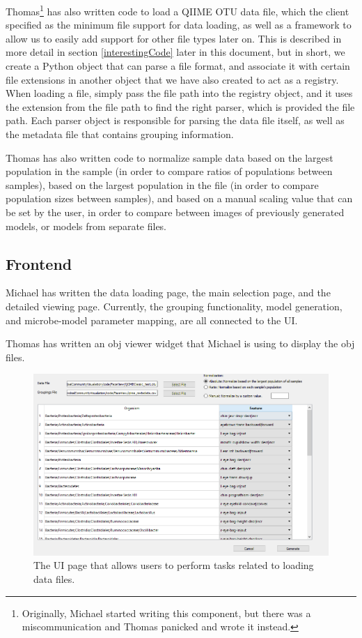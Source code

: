 \documentclass[letterpaper,10pt, onecolumn, draftclsnofoot]{IEEEtran}
\begin{document}
Thomas\footnote{Originally, Michael started writing this component, but there was a miscommunication and Thomas panicked and wrote it instead.} has also written code to load a QIIME OTU data file, which the client specified as the minimum file support for data loading, as well as a framework to allow us to easily add support for other file types later on. This is described in more detail in section \ref{interestingCode} later in this document, but in short, we create a Python object that can parse a file format, and associate it with certain file extensions in another object that we have also created to act as a registry. When loading a file, simply pass the file path into the registry object, and it uses the extension from the file path to find the right parser, which is provided the file path. Each parser object is responsible for parsing the data file itself, as well as the metadata file that contains grouping information.

Thomas has also written code to normalize sample data based on the largest population in the sample (in order to compare ratios of populations between samples), based on the largest population in the file (in order to compare population sizes between samples), and based on a manual scaling value that can be set by the user, in order to compare between images of previously generated models, or models from separate files.

\subsection{Frontend}

Michael has written the data loading page, the main selection page, and the detailed viewing page. Currently, the grouping functionality, model generation, and microbe-model parameter mapping, are all connected to the UI.

Thomas has written an obj viewer widget that Michael is using to display the obj files.

\begin{figure}
	\includegraphics[width=\textwidth]{loading.PNG}
	\caption{The UI page that allows users to perform tasks related to loading data files.}
	\label{fig:LoadingInterface}
\end{figure}
\end{document}
